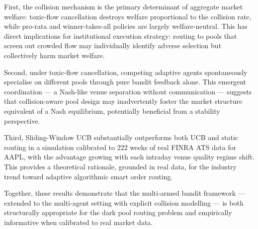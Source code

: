 \documentclass[11pt]{article}
\begin{document}
First, the collision mechanism is the primary determinant of aggregate
market welfare: toxic-flow cancellation destroys welfare proportional to
the collision rate, while pro-rata and winner-takes-all policies are
largely welfare-neutral. This has direct implications for institutional
execution strategy: routing to pools that screen out crowded flow may
individually identify adverse selection but collectively harm market
welfare.

Second, under toxic-flow cancellation, competing adaptive agents
spontaneously specialise on different pools through pure bandit feedback
alone. This emergent coordination --- a Nash-like venue separation without
communication --- suggests that collision-aware pool design may
inadvertently foster the market structure equivalent of a Nash
equilibrium, potentially beneficial from a stability perspective.

Third, Sliding-Window UCB substantially outperforms both UCB and static
routing in a simulation calibrated to 222 weeks of real FINRA ATS data
for AAPL, with the advantage growing with each intraday venue quality
regime shift. This provides a theoretical rationale, grounded in real
data, for the industry trend toward adaptive algorithmic smart order
routing.

Together, these results demonstrate that the multi-armed bandit framework
--- extended to the multi-agent setting with explicit collision modelling
--- is both structurally appropriate for the dark pool routing problem and
empirically informative when calibrated to real market data.



\end{document}
